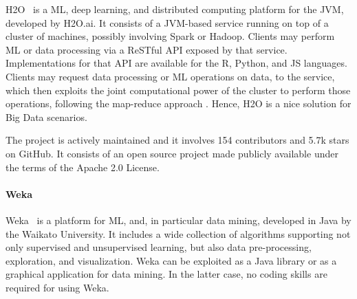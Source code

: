 \documentclass[12pt,a4paper,openright,twoside]{book}
\begin{document}
H2O~\cite{H2O} is a ML, deep learning, and distributed computing platform for the JVM, developed by H2O.ai.
%
%
It consists of a JVM-based service running on top of a cluster of machines, possibly involving Spark or Hadoop.
%
Clients may perform ML or data processing via a ReSTful API exposed by that service.
%
Implementations for that API are available for the R, Python, and JS languages.
%
%
Clients may request data processing or ML operations on data, to the service, which then exploits the joint computational power of the cluster to perform those operations, following the map-reduce approach \cite{DeanG08}.
%
Hence, H2O is a nice solution for Big Data scenarios.

The project is actively maintained and it involves 154 contributors and 5.7k stars on GitHub.
%
%
It consists of an open source project made publicly available under the terms of the Apache 2.0 License.

\paragraph{Weka}

Weka~\cite{WittenFH11} is a platform for ML, and, in particular data mining, developed in Java by the Waikato University.
%
It includes a wide collection of algorithms supporting not only supervised and unsupervised learning, but also data pre-processing, exploration, and visualization.
%
Weka can be exploited as a Java library or as a graphical application for data mining.
%
In the latter case, no coding skills are required for using Weka.
\end{document}
